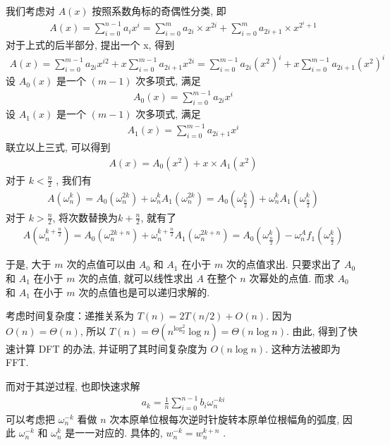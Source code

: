 \documentclass[UTF8, a4paper, 11pt]{ctexart}
\theoremstyle{definition}
\begin{document}
我们考虑对 $A(x)$ 按照系数角标的奇偶性分类, 即
\begin{align*}
    A(x)=\sum_{i = 0}^{n - 1} a_i x^i=\sum_{i = 0}^m a_{2i} \times x^{2i} + \sum_{i = 0}^m a_{2i + 1} \times x^{2^i + 1}
\end{align*}
对于上式的后半部分, 提出一个 x, 得到
\begin{align*}
    A(x)=\sum_{i = 0}^{m - 1} a_{2i} x^{i2} + x\sum_{i = 0}^{m - 1} a_{2i + 1} x^{2i}=\sum_{i = 0}^{m - 1} a_{2i} (x^{2})^{i} + x\sum_{i = 0}^{m - 1} a_{2i + 1} (x^2)^{i}
\end{align*}
设 $A_0(x)$ 是一个 $(m-1)$ 次多项式, 满足
\begin{align*}
    A_0(x)=\sum_{i = 0}^{m - 1} a_{2i} x^i
\end{align*}
设 $A_1(x)$ 是一个 $(m-1)$ 次多项式, 满足
\begin{align*}
    A_1(x)=\sum_{i = 0}^{m - 1} a_{2i + 1}x^i
\end{align*}
联立以上三式, 可以得到
\begin{align*}
    A(x)=A_0(x^2) + x \times A_1(x^2)
\end{align*}
对于 $k<\frac{n}{2}$ , 我们有
\begin{align*}
    A(\omega_n^k)=A_0(\omega_n^{2k})+\omega_n^kA_1(\omega_n^{2k})=A_0(\omega_{\frac{n}{2}}^k)+\omega_n^kA_1(\omega_{\frac{n}{2}}^k)
\end{align*}
对于 $k>\frac{n}{2}$, 将次数替换为$k+\frac{n}{2}$, 就有了
\begin{align*}
    A\left(\omega_n^{k+\frac{n}{2}}\right)=A_0\left(\omega_{n}^{2k+n}\right)+\omega_{n}^{k+\frac{n}{2}}A_1(\omega_n^{2k+n})=A_0(\omega_{\frac{n}{2}}^k)-\omega_n^Af_1(\omega_{\frac{n}{2}}^k)
\end{align*}

于是, 大于 $m$ 次的点值可以由 $A_0$ 和 $A_1$ 在小于 $m$ 次的点值求出. 只要求出了 $A_0$ 和 $A_1$ 在小于 $m$ 次的点值, 就可以线性求出 $A$ 在整个 $n$ 次幂处的点值. 而求 $A_0$ 和 $A_1$ 在小于 $m$ 次的点值也是可以递归求解的.

考虑时间复杂度：递推关系为 $T(n)=2T(n / 2) + O(n)$. 因为 $O(n)=\Theta(n)$, 所以 $T(n)=\Theta(n^{\log_2^2} \log n) = \Theta(n \log n)$. 由此, 得到了快速计算 DFT 的办法, 并证明了其时间复杂度为 $O(n \log n)$. 这种方法被即为 FFT.

而对于其逆过程, 也即快速求解
\begin{align*}
    a_k=\frac{1}{n} \sum_{i = 0}^{n - 1} b_i \omega_n^{-ki}
\end{align*}
可以考虑把 $\omega_n^{-k}$ 看做 $n$ 次本原单位根每次逆时针旋转本原单位根幅角的弧度, 因此 $\omega_n^{-k}$ 和 $\omega_n^k$ 是一一对应的. 具体的, $w_n^{-k} = w_n^{k + n}$ . 
\end{document}
